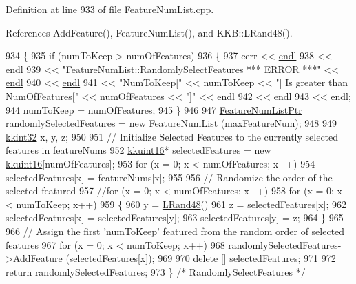 Definition at line 933 of file Feature\+Num\+List.\+cpp.



References Add\+Feature(), Feature\+Num\+List(), and K\+K\+B\+::\+L\+Rand48().


\begin{DoxyCode}
934 \{
935   \textcolor{keywordflow}{if}  (numToKeep > numOfFeatures)
936   \{
937     cerr << \hyperlink{namespace_k_k_b_ad1f50f65af6adc8fa9e6f62d007818a8}{endl}
938          << \hyperlink{namespace_k_k_b_ad1f50f65af6adc8fa9e6f62d007818a8}{endl}
939          << \textcolor{stringliteral}{"FeatureNumList::RandomlySelectFeatures    *** ERROR ***"} << \hyperlink{namespace_k_k_b_ad1f50f65af6adc8fa9e6f62d007818a8}{endl}
940          << \hyperlink{namespace_k_k_b_ad1f50f65af6adc8fa9e6f62d007818a8}{endl}
941          << \textcolor{stringliteral}{"NumToKeep["} << numToKeep << \textcolor{stringliteral}{"]  Is greater than  NumOfFeatures["} << numOfFeatures << \textcolor{stringliteral}{"]"} << 
      \hyperlink{namespace_k_k_b_ad1f50f65af6adc8fa9e6f62d007818a8}{endl}
942          << \hyperlink{namespace_k_k_b_ad1f50f65af6adc8fa9e6f62d007818a8}{endl}
943          << \hyperlink{namespace_k_k_b_ad1f50f65af6adc8fa9e6f62d007818a8}{endl};
944     numToKeep = numOfFeatures;
945   \}
946 
947   \hyperlink{class_k_k_m_l_l_1_1_feature_num_list}{FeatureNumListPtr}  randomlySelectedFeatures = \textcolor{keyword}{new} 
      \hyperlink{class_k_k_m_l_l_1_1_feature_num_list_af5d957089c38e96571e261eb77d7faff}{FeatureNumList} (maxFeatureNum);
948 
949   \hyperlink{namespace_k_k_b_a8fa4952cc84fda1de4bec1fbdd8d5b1b}{kkint32} x, y, z;
950 
951   \textcolor{comment}{// Initialize Selected Features to the currently selected features in featureNums}
952   \hyperlink{namespace_k_k_b_aa8c7d4d30381c8a0b6fce68974a9c8a9}{kkuint16}*  selectedFeatures = \textcolor{keyword}{new} \hyperlink{namespace_k_k_b_aa8c7d4d30381c8a0b6fce68974a9c8a9}{kkuint16}[numOfFeatures];
953   \textcolor{keywordflow}{for}  (x = 0; x < numOfFeatures; x++)
954     selectedFeatures[x] = featureNums[x];
955 
956   \textcolor{comment}{// Randomize the order of the selected featured}
957   \textcolor{comment}{//for (x = 0; x < numOfFeatures; x++)}
958   \textcolor{keywordflow}{for} (x = 0; x < numToKeep; x++)
959   \{
960     y = \hyperlink{namespace_k_k_b_aad6ec2b84e0888ea95b620ce79b60e40}{LRand48}() %
961     z = selectedFeatures[x];
962     selectedFeatures[x] = selectedFeatures[y];
963     selectedFeatures[y] = z;
964   \}
965 
966   \textcolor{comment}{// Assign the first 'numToKeep'  featured from the random order of selected features}
967   \textcolor{keywordflow}{for}  (x = 0;  x < numToKeep;  x++)
968     randomlySelectedFeatures->\hyperlink{class_k_k_m_l_l_1_1_feature_num_list_a1d3b119854c90e602cab62ca46cd05cc}{AddFeature} (selectedFeatures[x]);
969 
970   \textcolor{keyword}{delete}  [] selectedFeatures;
971 
972   \textcolor{keywordflow}{return}  randomlySelectedFeatures;
973 \}  \textcolor{comment}{/* RandomlySelectFeatures */}
\end{DoxyCode}
